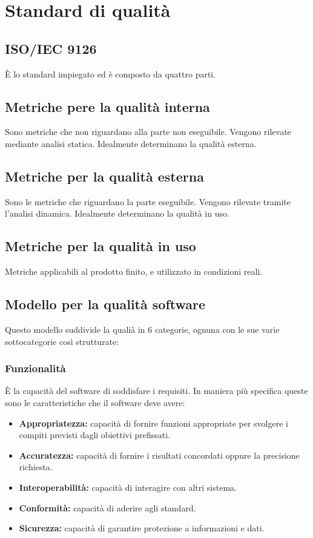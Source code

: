\section{Standard di qualit\`a}
\subsection{ISO/IEC 9126}
\`E lo standard impiegato ed \`e composto da quattro parti.
\subsection{Metriche pere la qualit\`a interna}
Sono metriche che non riguardano alla parte non eseguibile. Vengono rilevate mediante analisi statica. Idealmente determinano la qualit\`a esterna.
\subsection{Metriche per la qualit\`a esterna}
Sono le metriche che riguardano la parte eseguibile. Vengono rilevate tramite l'analisi dinamica. Idealmente determinano la qualit\`a in uso.
\subsection{Metriche per la qualit\`a in uso}
Metriche applicabili al prodotto finito, e utilizzato in condizioni reali.
\subsection{Modello per la qualit\`a software}
Questo modello suddivide la quali\`a in 6 categorie, ognuna con le sue varie sottocategorie cos\`i strutturate:
\subsubsection{Funzionalit\`a}
\`E la capacit\`a del software di soddisfare i requisiti. In maniera pi\`u specifica queste sono le caratteristiche che il software deve avere:
\begin{itemize}
    \item \textbf{Appropriatezza:} capacit\`a di fornire funzioni appropriate per svolgere i compiti previsti dagli obiettivi prefissati.
    \item \textbf{Accuratezza:} capacit\`a di fornire i risultati concordati oppure la precisione richiesta.
    \item \textbf{Interoperabilit\`a:} capacit\`a  di interagire con altri sistema.
    \item \textbf{Conformit\`a:} capacit\`a di aderire agli standard.
    \item \textbf{Sicurezza:} capacit\`a di garantire protezione a informazioni e dati.
\end{itemize}
